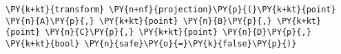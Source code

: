 \begin{Verbatim}[commandchars=\\\{\}]
    \PY{k+kt}{transform} \PY{n+nf}{projection}\PY{p}{(}\PY{k+kt}{point} \PY{n}{A}\PY{p}{,} \PY{k+kt}{point} \PY{n}{B}\PY{p}{,} \PY{k+kt}{point} \PY{n}{C}\PY{p}{,} \PY{k+kt}{point} \PY{n}{D}\PY{p}{,} \PY{k+kt}{bool} \PY{n}{safe}\PY{o}{=}\PY{k}{false}\PY{p}{)}
\end{Verbatim}
